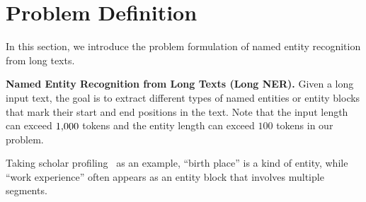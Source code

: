 \section{Problem Definition}

In this section, we introduce the problem formulation of named entity recognition from long texts.

\begin{problem}
\textbf{Named Entity Recognition from Long Texts (Long NER).}
Given a long input text, 
the goal is to extract different types of named entities or entity blocks
that mark their start and end positions in the text.
\textnormal{Note that the input length can exceed $1{\small ,}000$ tokens and the entity length can exceed $100$ tokens in our problem.}
\end{problem}

Taking scholar profiling~\cite{schiaffino2009intelligent,gu2018profiling} as an example, ``birth place'' is a kind of entity,
while ``work experience'' often appears as an entity block
that involves multiple segments.